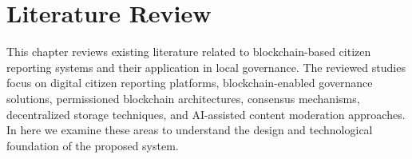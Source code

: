 \chapter{Literature Review}

This chapter reviews existing literature related to blockchain-based citizen reporting systems and their application in local governance. The reviewed studies focus on digital citizen reporting platforms, blockchain-enabled governance solutions, permissioned blockchain architectures, consensus mechanisms, decentralized storage techniques, and \ac{AI}-assisted content moderation approaches. In here we examine these areas to understand the design and technological foundation of the proposed system.










% 
% 
% 

